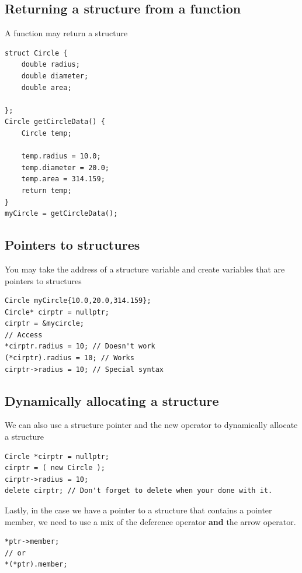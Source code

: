 \documentclass{report}
\begin{document}
	\subsection{Returning a structure from a function}
	\bigbreak \noindent 
	\begin{concept}
	   A function may return a structure 
	\end{concept}
	\bigbreak \noindent 
	\sepline
	\begin{verbatim}
struct Circle {
    double radius;
    double diameter;
    double area;

};
Circle getCircleData() {
    Circle temp;

    temp.radius = 10.0;
    temp.diameter = 20.0;
    temp.area = 314.159;
    return temp;
}
myCircle = getCircleData();
	\end{verbatim}
	\sepline

	\pagebreak \bigbreak \noindent 
	\subsection{Pointers to structures}
	\bigbreak \noindent 
	\begin{concept}
	   You may take the address of a structure variable and create variables that are pointers to structures 
	\end{concept}
	\bigbreak \noindent 
	\sepline
	\begin{verbatim}
Circle myCircle{10.0,20.0,314.159};
Circle* cirptr = nullptr;
cirptr = &mycircle;
// Access
*cirptr.radius = 10; // Doesn't work
(*cirptr).radius = 10; // Works
cirptr->radius = 10; // Special syntax
	\end{verbatim}
	\sepline
	\bigbreak \noindent 

	\bigbreak \noindent 
	\subsection{Dynamically allocating a structure}
	\bigbreak \noindent 
	We can also use a structure pointer and the new operator to dynamically allocate a structure
	\bigbreak \noindent 
	\sepline
	\begin{verbatim}
Circle *cirptr = nullptr;
cirptr = ( new Circle );
cirptr->radius = 10;
delete cirptr; // Don't forget to delete when your done with it.
	\end{verbatim}
	\sepline
	\bigbreak \noindent 
	\bigbreak \noindent 
	Lastly, in the case we have a pointer to a structure that contains a pointer member, we need to use a mix of the deference operator \textbf{and} the arrow operator. 
	\bigbreak \noindent 
	\sepline
	\begin{verbatim}
*ptr->member;
// or
*(*ptr).member;
	\end{verbatim}
	\sepline
\end{document}
